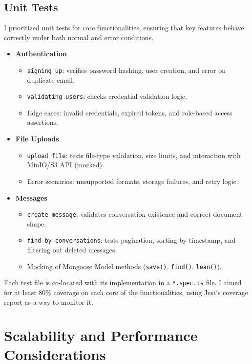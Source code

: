 \subsection{Unit Tests}

I prioritized unit tests for core functionalities, ensuring that key features behave correctly under both normal and error conditions.

\begin{itemize}
  \item \textbf{Authentication}
    \begin{itemize}
      \item \texttt{signing up}: verifies password hashing, user creation, and error on duplicate email.
      \item \texttt{validating users}: checks credential validation logic.
      \item Edge cases: invalid credentials, expired tokens, and role-based access assertions.
    \end{itemize}

  \item \textbf{File Uploads}
    \begin{itemize}
      \item \texttt{upload file}: tests file-type validation, size limits, and interaction with MinIO/S3 API (mocked).
      \item Error scenarios: unsupported formats, storage failures, and retry logic.
    \end{itemize}

  \item \textbf{Messages}
    \begin{itemize}
      \item \texttt{create message}: validates conversation existence and correct document shape.
      \item \texttt{find by conversations}: tests pagination, sorting by timestamp, and filtering out deleted messages.
      \item Mocking of Mongoose Model methods (\texttt{save()}, \texttt{find()}, \texttt{lean()}).
    \end{itemize}
\end{itemize}

Each test file is co-located with its implementation in a \texttt{*.spec.ts} file.  I aimed for at least 80\% coverage on each core of the functionalities, using Jest`s coverage report as a way to monitor it.

\section{Scalability and Performance Considerations}

